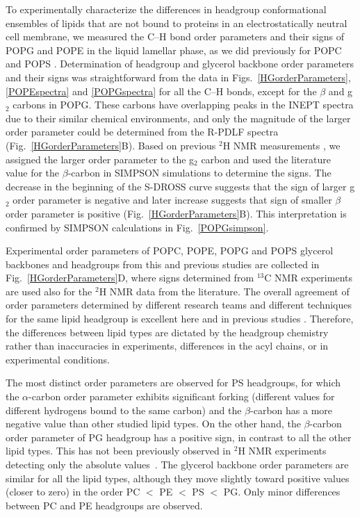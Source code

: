 \documentclass[aps,prl,superscriptaddress,twocolumn]{revtex4}
\begin{document}
To experimentally characterize the differences in headgroup conformational ensembles of lipids that are not
bound to proteins in an electrostatically neutral cell membrane, we measured the C--H bond order parameters
and their signs of POPG and POPE in the liquid lamellar phase, as we did previously for POPC and POPS \cite{ferreira13,ferreira16,antila19}.
Determination of headgroup and glycerol backbone order parameters and their signs
was straightforward from the data in Figs.~\ref{HGorderParameters}, \ref{POPEspectra} and \ref{POPGspectra}
for all the C--H bonds, except for the $\beta$ and g$_2$ carbons in POPG.
These carbons have overlapping peaks in the INEPT spectra due to their similar chemical environments,
and only the magnitude of the larger order parameter could be determined from the R-PDLF spectra (Fig.~\ref{HGorderParameters}B).
Based on previous $^2$H NMR measurements \cite{wohlgemuth80,gally81,borle85},
we assigned the larger order parameter to the g$_2$ carbon
and used the literature value for the $\beta$-carbon in SIMPSON simulations to determine the signs.
The decrease in the beginning of the S-DROSS curve suggests that the sign of larger g$_2$ order parameter
is negative and later increase suggests that sign of smaller $\beta$ order parameter is positive (Fig.~\ref{HGorderParameters}B).
This interpretation is confirmed by SIMPSON calculations in Fig.~\ref{POPGsimpson}.

Experimental order parameters of POPC, POPE, POPG and POPS glycerol backbones and headgroups from this and previous studies are collected in Fig.~\ref{HGorderParameters}D, where signs determined from $^{13}$C NMR experiments are used also for the $^2$H NMR data from the literature. The overall agreement of order parameters determined by different research teams and different techniques for the same lipid headgroup is excellent here and in previous studies \cite{botan15,ollila16,antila19}. Therefore, the differences between lipid types are dictated by the headgroup chemistry rather than inaccuracies in experiments, differences in the acyl chains, or in experimental conditions.


The most distinct order parameters are observed for PS headgroups, for which the $\alpha$-carbon order parameter exhibits significant forking (different values for different hydrogens bound to the same carbon) and the $\beta$-carbon has a more negative value than other studied lipid types. On the other hand, the $\beta$-carbon order parameter of PG headgroup has a positive sign, in contrast to all the other lipid types. This has not been previously observed  in $^2$H NMR experiments detecting only the absolute values~\cite{wohlgemuth80,gally81,borle85}. The glycerol backbone order parameters are similar for all the lipid types, although they move slightly toward positive values (closer to zero) in the order PC $<$ PE $<$ PS $<$ PG. Only minor differences between PC and PE headgroups are observed.
\end{document}
